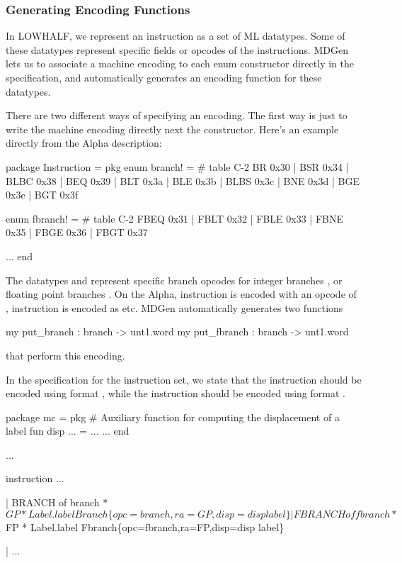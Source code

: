 \subsubsection{Generating Encoding Functions}

   In LOWHALF, we represent an instruction as a set of ML datatypes.
Some of these datatypes represent specific fields or 
opcodes of the instructions.
MDGen lets us to associate a machine encoding to each enum constructor
directly in the specification, and automatically generates an 
encoding function for these datatypes.

There are two different ways of specifying an encoding.  The first way
is just to write the machine encoding directly next the constructor.
Here's an example directly from the Alpha description:
\begin{SML}
   package Instruction =
   pkg
      enum branch! =  #  table C-2 
         BR   0x30
                   | BSR 0x34
                              | BLBC 0x38
       | BEQ  0x39 | BLT 0x3a | BLE  0x3b
       | BLBS 0x3c | BNE 0x3d | BGE  0x3e
       | BGT  0x3f

      enum fbranch! = #  table C-2 
                     FBEQ 0x31 | FBLT 0x32
       | FBLE 0x33             | FBNE 0x35
       | FBGE 0x36 | FBGT 0x37

      ...
   end
\end{SML}

The datatypes  and  represent specific
branch opcodes for integer branches , or floating point
branches .  On the Alpha, instruction  is encoded
with an opcode of , instruction  is encoded 
as  etc.  MDGen automatically generates two functions
\begin{SML}
    my put_branch : branch -> unt1.word
    my put_fbranch : branch -> unt1.word
\end{SML}
that perform this encoding.    

In the specification for the instruction set, we state that the
 instruction should be encoded using format ,
while the  instruction should be encoded using
format .
\begin{SML}
   package mc =
   pkg
      #  Auxiliary function for computing the displacement of a label 
      fun disp ... = ...
      ...
   end

   ...

   instruction
     ...

   | BRANCH of branch * $GP * Label.label
     Branch\{opc=branch,ra=GP,disp=disp label\}

   | FBRANCH of fbranch * $FP * Label.label
     Fbranch\{opc=fbranch,ra=FP,disp=disp label\}

   | ...
\end{SML}

